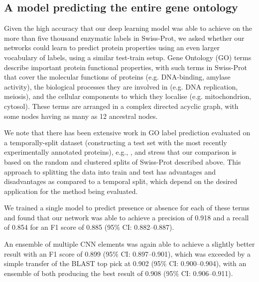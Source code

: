 \subsection*{A model predicting the entire gene ontology}
Given the high accuracy that our deep learning model was able to achieve on the more than five thousand enzymatic labels in Swiss-Prot, we asked whether our networks could learn to predict protein properties using an even larger vocabulary of labels, using a similar test-train setup. Gene Ontology \citep{ashburner2000gene, gene2019gene, carbon2009amigo} (GO) terms describe important protein functional properties, with \DIFdelbegin {}\DIFdelend \DIFaddbegin {}%
\DIFadd{) }\DIFaddend such terms in Swiss-Prot that cover the molecular functions of proteins (e.g. DNA-binding, amylase activity), the biological processes they are involved in (e.g. DNA replication, meiosis), and the cellular components to which they localise (e.g. mitochondrion, cytosol). These terms are arranged in a complex directed acyclic graph, with some nodes having as many as 12 ancestral nodes.


We note that there has been extensive work in GO label prediction evaluated on a temporally-split dataset (constructing a test set with the most recently experimentally annotated proteins), e.g., \citep{zhou2019cafa}, and stress that our comparison is based on the random and clustered splits of Swiss-Prot described above.  This approach to splitting the data into train and test has advantages and disadvantages as compared to a temporal split, which depend on the desired application for the method being evaluated.


We trained a single model to predict presence or absence for each of these terms and found that our network was able to achieve a precision of 0.918 and a recall of 0.854 for an F1 score of 0.885 (95\% CI: 0.882--0.887). 

An ensemble of multiple CNN elements was again able to achieve a slightly better result with an F1 score of 0.899 (95\% CI: 0.897--0.901), which was exceeded by a simple transfer of the BLAST top pick at 0.902 (95\% CI: 0.900--0.904), with an ensemble of both producing the best result of 0.908 (95\% CI: 0.906--0.911).

\DIFaddbegin {}%


